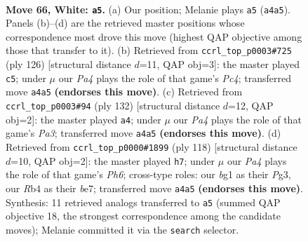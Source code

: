 \documentclass[11pt]{article}
\begin{document}
\clearpage

\begin{figure}[p]\centering
\begin{subfigure}{0.46\textwidth}\centering
\resizebox{\linewidth}{!}{%
\newchessgame
\chessboard[
  setfen={7k/8/3Nn3/8/PR6/7r/2K5/6b1 w - - 6 66},
  showmover=false,
  pgfstyle=straightmove, color=movearrow, markmove={a4-a5}
]}
\caption{}
\end{subfigure}\hfill
\begin{subfigure}{0.46\textwidth}\centering
\resizebox{\linewidth}{!}{%
\newchessgame
\chessboard[
  setfen={6k1/R7/5b2/7K/2P5/6r1/8/8 w - - 3 64},
  showmover=false,
  pgfstyle=straightmove, color=movearrow, markmove={c4-c5}
]}
\caption{}
\end{subfigure}
\\[4pt]
\begin{subfigure}{0.46\textwidth}\centering
\resizebox{\linewidth}{!}{%
\newchessgame
\chessboard[
  setfen={8/8/8/2R5/4b3/P7/3k3r/5K2 w - - 10 67},
  showmover=false,
  pgfstyle=straightmove, color=movearrow, markmove={a3-a4}
]}
\caption{}
\end{subfigure}\hfill
\begin{subfigure}{0.46\textwidth}\centering
\resizebox{\linewidth}{!}{%
\newchessgame
\chessboard[
  setfen={7R/4b3/7P/3k4/8/3K2P1/5r2/8 w - - 0 60},
  showmover=false,
  pgfstyle=straightmove, color=movearrow, markmove={h6-h7}
]}
\caption{}
\end{subfigure}
\caption{\textbf{Move 66, White: \texttt{a5}.} (a) Our position; Melanie plays \texttt{a5} (\texttt{a4a5}). Panels (b)--(d) are the retrieved master positions whose correspondence most drove this move (highest QAP objective among those that transfer to it). (b) Retrieved from \texttt{ccrl\_top\_p0003\#725} (ply 126) [structural distance $d$=11, QAP obj=3]: the master played \texttt{c5}; under $\mu$ our \emph{Pa4} plays the role of that game's \emph{Pc4}; transferred move \texttt{a4a5} \textbf{(endorses this move)}. (c) Retrieved from \texttt{ccrl\_top\_p0003\#94} (ply 132) [structural distance $d$=12, QAP obj=2]: the master played \texttt{a4}; under $\mu$ our \emph{Pa4} plays the role of that game's \emph{Pa3}; transferred move \texttt{a4a5} \textbf{(endorses this move)}. (d) Retrieved from \texttt{ccrl\_top\_p0000\#1899} (ply 118) [structural distance $d$=10, QAP obj=2]: the master played \texttt{h7}; under $\mu$ our \emph{Pa4} plays the role of that game's \emph{Ph6}; cross-type roles: our \emph{b}g1 as their \emph{P}g3, our \emph{R}b4 as their \emph{b}e7; transferred move \texttt{a4a5} \textbf{(endorses this move)}. Synthesis: 11 retrieved analogs transferred to \texttt{a5} (summed QAP objective 18, the strongest correspondence among the candidate moves); Melanie committed it via the \texttt{search} selector.}
\label{fig:thought-m130}
\end{figure}
\end{document}
